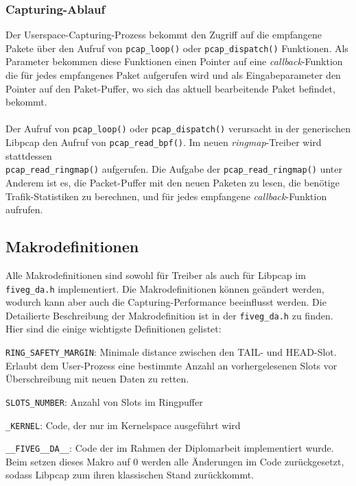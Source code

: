 \subsubsection*{Capturing-Ablauf}
Der Userspace-Capturing-Prozess bekommt den Zugriff auf die empfangene Pakete 
über den Aufruf von \verb+pcap_loop()+ oder \verb+pcap_dispatch()+ Funktionen. 
Als Parameter bekommen diese Funktionen einen Pointer auf eine \emph{callback}-Funktion
die für jedes empfangenes Paket aufgerufen wird und als Eingabeparameter den Pointer 
auf den Paket-Puffer, wo sich das aktuell bearbeitende Paket befindet, bekommt.\\\\
%
Der Aufruf von \verb+pcap_loop()+ oder \verb+pcap_dispatch()+ verursacht in der generischen 
Libpcap den Aufruf von \verb+pcap_read_bpf()+. Im neuen \emph{ringmap}-Treiber wird stattdessen \\
\verb+pcap_read_ringmap()+ aufgerufen. Die Aufgabe der \verb+pcap_read_ringmap()+ unter Anderem ist 
es, die Packet-Puffer mit den neuen Paketen zu lesen, die benötige Trafik-Statistiken zu berechnen, 
und für jedes empfangene \emph{callback}-Funktion aufrufen. 

\subsection{Makrodefinitionen}
Alle Makrodefinitionen sind sowohl für Treiber als auch für Libpcap im
\verb+fiveg_da.h+ implementiert.  Die Makrodefinitionen können geändert werden,
wodurch kann aber auch die Capturing-Performance beeinflusst werden. Die Detailierte 
Beschreibung der Makrodefinition ist in der \verb+fiveg_da.h+ zu finden.
Hier sind die einige wichtigste Definitionen gelistet:  
\begin{description}
	\item \verb+RING_SAFETY_MARGIN+:
		Minimale distance zwischen den TAIL- und HEAD-Slot. Erlaubt dem User-Prozess 
		eine bestimmte Anzahl an vorhergelesenen Slots vor Überschreibung mit neuen Daten 
		zu retten. 
	\item \verb+SLOTS_NUMBER+:
		Anzahl von Slots im Ringpuffer
	\item \verb+_KERNEL+:
		Code, der nur im Kernelspace ausgeführt wird
	\item \verb+__FIVEG__DA__+:
		Code der im Rahmen der Diplomarbeit implementiert wurde. Beim setzen dieses Makro auf 0 
		werden alle Änderungen im Code zurückgesetzt, sodass Libpcap zum ihren klassischen Stand
		zurückkommt.
\end{description}
